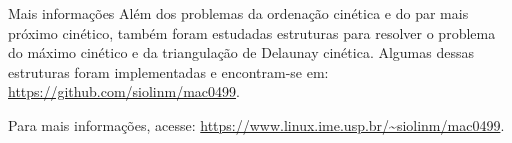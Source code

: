 \documentclass[final]{beamer}
\begin{document}
\begin{frame}[t]
\begin{columns}[t]
\begin{column}{0.60\paperwidth}
                \begin{block}{Mais informações}
                    Além dos problemas da ordenação cinética e do par mais próximo cinético,
                    também foram estudadas estruturas para resolver o problema do máximo cinético e da
                    triangulação de Delaunay cinética.
                    Algumas dessas estruturas foram implementadas e encontram-se
                    em: \textcolor{jblue}{{\url{https://github.com/siolinm/mac0499}}}.

                    Para mais informações, acesse:
                    \textcolor{jblue}{{\url{https://www.linux.ime.usp.br/~siolinm/mac0499}}}.
                \end{block}


            \end{column}

        \end{columns}
    \end{frame}
\end{document}
